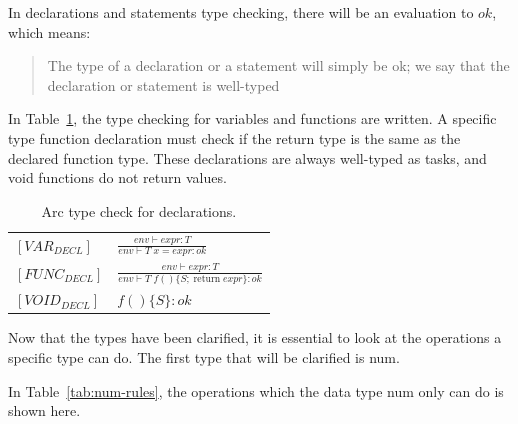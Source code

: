 In declarations and statements type checking, there will be an evaluation to $ok$, which means:

\blockcquote{Huttel2010}{The type of a declaration or a statement will simply be ok; we say that the declaration or statement is well-typed}

In Table~\ref{tab:DeclTypeCheck}, the type checking for variables and functions are written. A specific type function declaration must check if the return type is the same as the declared function type. These declarations are always well-typed as tasks, and void functions do not return values.


\begin{table}[htb!]
    \centering
    \begin{tabular}{ll}
        \toprule
        $[VAR_{DECL}] $  & $\frac{env \vdash expr : T}{env \vdash T \;x = expr : ok}$                            \\  [12pt]
        $[FUNC_{DECL}] $ & $\frac{env \vdash expr : T}{env \vdash T \;f() \{S; \;\text{return} \; expr\}  : ok}$ \\  [12pt]
        $[VOID_{DECL}] $ & $f()\{S\}  : ok$                                                                      \\
        \bottomrule
    \end{tabular}
    \caption{Arc type check for declarations.}
    \label{tab:DeclTypeCheck}
\end{table}


Now that the types have been clarified, it is essential to look at the operations a specific type can do. The first type that will be clarified is num.

In Table~\ref{tab:num-rules}, the operations which the data type num only can do is shown here.



